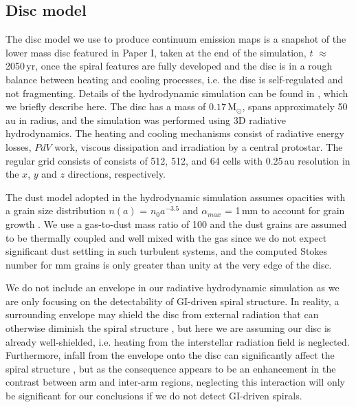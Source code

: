 \documentclass[fleqn,usenatbib]{mnras}
\begin{document}
\subsection{Disc model}

The disc model we use to produce continuum emission maps is a snapshot of the lower mass disc featured in Paper I, taken at the end of the simulation, $t$ $\approx$ 2050\,yr, once the spiral features are fully developed and the disc is in a rough balance between heating and cooling processes, i.e. the disc is self-regulated and not fragmenting. Details of the hydrodynamic simulation can be found in , which we briefly describe here. The disc has a mass of $0.17\,\mathrm{M}_{\odot}$, spans approximately 50\,au in radius, and the simulation was performed using 3D radiative hydrodynamics. The heating and cooling mechanisms consist of radiative energy losses, $PdV$ work, viscous dissipation and irradiation by a central protostar. The regular grid consists of consists of 512, 512, and 64 cells with 0.25\,au resolution in the $x$, $y$ and $z$ directions, respectively.

\smallskip

The dust model adopted in the hydrodynamic simulation assumes \citet{D'Alessio&Calvet2001} opacities with a grain size distribution $n(a)$ = $n{_0}a^{-3.5}$ and $\alpha_{max}$ = 1\,mm to account for grain growth \citep{D'Alessio&Calvet2006}. We use a gas-to-dust mass ratio of 100 and the dust grains are assumed to be thermally coupled and well mixed with the gas since we do not expect significant dust settling in such turbulent systems, and the computed Stokes number for mm grains is only greater than unity at the very edge of the disc.

\smallskip

We do not include an envelope in our radiative hydrodynamic simulation as we are only focusing on the detectability of GI-driven spiral structure. In reality, a surrounding envelope may shield the disc from external radiation that can otherwise diminish the spiral structure \citep[e.g.][]{Cai&Durisen2008, Kratter&Murray-Clay2011}, but here we are assuming our disc is already well-shielded, i.e. heating from the interstellar radiation field is neglected. Furthermore, infall from the envelope onto the disc can significantly affect the spiral structure \citep[e.g.][]{Harsono2011}, but as the consequence appears to be an enhancement in the contrast between arm and inter-arm regions, neglecting this interaction will only be significant for our conclusions if we do not detect GI-driven spirals.
\end{document}
